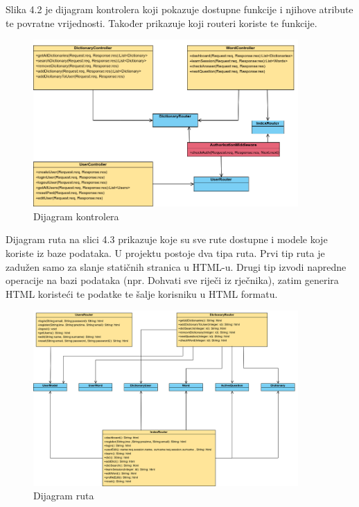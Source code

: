             Slika 4.2 je dijagram kontrolera koji pokazuje dostupne funkcije i njihove atribute te povratne vrijednosti. Također prikazuje koji routeri koriste te funkcije.
				\begin{figure}[H]
					\includegraphics[width=0.9\textwidth]{dijagrami/slika1.png} 
					\centering
					\caption{Dijagram kontrolera}
					\label{fig:class_diagram}
				\end{figure}			
			\eject
            Dijagram ruta na slici 4.3 prikazuje koje su sve rute dostupne i modele koje koriste iz baze podataka. U projektu postoje dva tipa ruta. Prvi tip ruta je zadužen samo za slanje statičnih stranica u HTML-u. Drugi tip izvodi napredne operacije na bazi podataka (npr. Dohvati sve riječi iz rječnika), zatim generira HTML koristeći te podatke te šalje korisniku u HTML formatu.
				\begin{figure}[H]
					\includegraphics[width=0.9\textwidth]{dijagrami/slika2.png} 
					\centering
					\caption{Dijagram ruta}
					\label{fig:class_diagram}
				\end{figure}			
